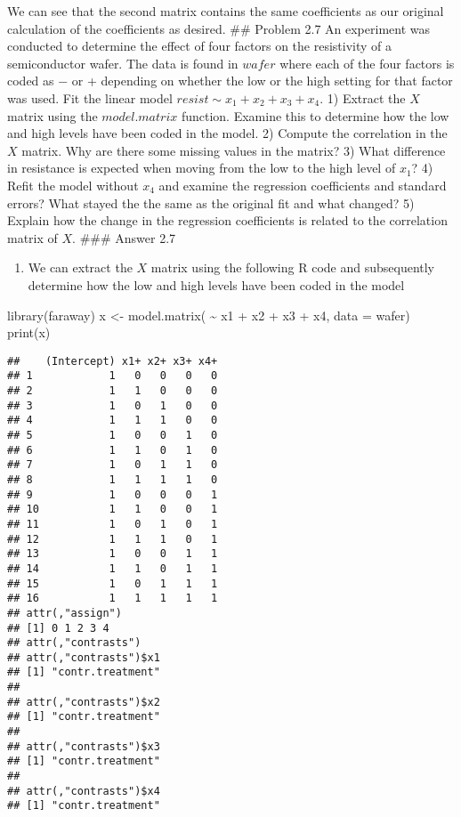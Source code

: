 \documentclass[
]{article}
\newenvironment{Shaded}{\begin{snugshade}}{\end{snugshade}}
\newcommand{\AttributeTok}[1]{\textcolor[rgb]{0.77,0.63,0.00}{#1}}
\newcommand{\FunctionTok}[1]{\textcolor[rgb]{0.00,0.00,0.00}{#1}}
\newcommand{\NormalTok}[1]{#1}
\newcommand{\OtherTok}[1]{\textcolor[rgb]{0.56,0.35,0.01}{#1}}
\newcommand{\SpecialCharTok}[1]{\textcolor[rgb]{0.00,0.00,0.00}{#1}}
\providecommand{\tightlist}{%
  \setlength{\itemsep}{0pt}\setlength{\parskip}{0pt}}
\begin{document}
We can see that the second matrix contains the same coefficients as our
original calculation of the coefficients as desired. \#\# Problem 2.7 An
experiment was conducted to determine the effect of four factors on the
resistivity of a semiconductor wafer. The data is found in \(wafer\)
where each of the four factors is coded as − or + depending on whether
the low or the high setting for that factor was used. Fit the linear
model \(resist ∼ x_1 + x_2 + x_3 + x_4\). 1) Extract the \(X\) matrix
using the \(model.matrix\) function. Examine this to determine how the
low and high levels have been coded in the model. 2) Compute the
correlation in the \(X\) matrix. Why are there some missing values in
the matrix? 3) What difference in resistance is expected when moving
from the low to the high level of \(x_1\)? 4) Refit the model without
\(x_4\) and examine the regression coefficients and standard errors?
What stayed the the same as the original fit and what changed? 5)
Explain how the change in the regression coefficients is related to the
correlation matrix of \(X\). \#\#\# Answer 2.7

\begin{enumerate}
\def\labelenumi{\arabic{enumi})}
\tightlist
\item
  We can extract the \(X\) matrix using the following R code and
  subsequently determine how the low and high levels have been coded in
  the model
\end{enumerate}

\begin{Shaded}
\begin{Highlighting}[]
  \FunctionTok{library}\NormalTok{(faraway)}
\NormalTok{  x }\OtherTok{\textless{}{-}} \FunctionTok{model.matrix}\NormalTok{( }\SpecialCharTok{\textasciitilde{}}\NormalTok{ x1 }\SpecialCharTok{+}\NormalTok{ x2 }\SpecialCharTok{+}\NormalTok{ x3 }\SpecialCharTok{+}\NormalTok{ x4, }\AttributeTok{data =}\NormalTok{ wafer)}
  \FunctionTok{print}\NormalTok{(x)}
\end{Highlighting}
\end{Shaded}

\begin{verbatim}
##    (Intercept) x1+ x2+ x3+ x4+
## 1            1   0   0   0   0
## 2            1   1   0   0   0
## 3            1   0   1   0   0
## 4            1   1   1   0   0
## 5            1   0   0   1   0
## 6            1   1   0   1   0
## 7            1   0   1   1   0
## 8            1   1   1   1   0
## 9            1   0   0   0   1
## 10           1   1   0   0   1
## 11           1   0   1   0   1
## 12           1   1   1   0   1
## 13           1   0   0   1   1
## 14           1   1   0   1   1
## 15           1   0   1   1   1
## 16           1   1   1   1   1
## attr(,"assign")
## [1] 0 1 2 3 4
## attr(,"contrasts")
## attr(,"contrasts")$x1
## [1] "contr.treatment"
## 
## attr(,"contrasts")$x2
## [1] "contr.treatment"
## 
## attr(,"contrasts")$x3
## [1] "contr.treatment"
## 
## attr(,"contrasts")$x4
## [1] "contr.treatment"
\end{verbatim}
\end{document}
